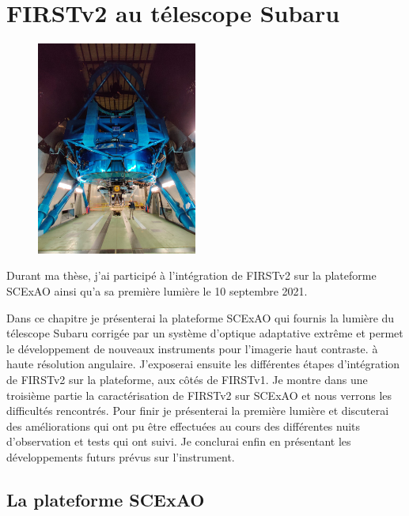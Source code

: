 \chapter{FIRSTv2 au télescope Subaru}
\label{sec:FIRSTv2Subaru}
\setcounter{figure}{0}
\setcounter{table}{0}
\setcounter{equation}{0}

\minitoc

\begin{figure}[ht!]
    \centering
    \includegraphics[width=0.47\textwidth]{Figure_Chap5/20200121_999996.jpeg}
\end{figure}

\clearpage
Durant ma thèse, j'ai participé à l'intégration de \ac{FIRSTv2} sur la plateforme \ac{SCExAO} ainsi qu'a sa première lumière le 10 septembre 2021.

Dans ce chapitre je présenterai la plateforme \ac{SCExAO} qui fournis la lumière du télescope Subaru corrigée par un système d'optique adaptative extrême et permet le développement de nouveaux instruments pour l'imagerie haut contraste. à haute résolution angulaire. J'exposerai ensuite les différentes étapes d'intégration de \ac{FIRSTv2} sur la plateforme, aux côtés de \ac{FIRSTv1}. Je montre dans une troisième partie la caractérisation de \ac{FIRSTv2} sur \ac{SCExAO} et nous verrons les difficultés rencontrés. Pour finir je présenterai la première lumière et discuterai des améliorations qui ont pu être effectuées au cours des différentes nuits d'observation et tests qui ont suivi. Je conclurai enfin en présentant les développements futurs prévus sur l'instrument.


\section{La plateforme SCExAO}

